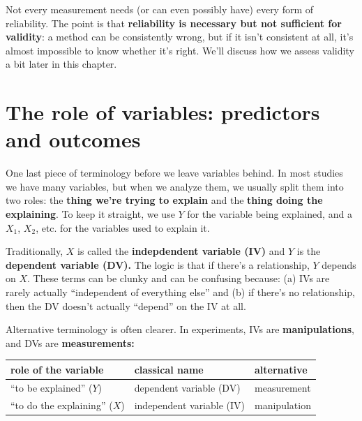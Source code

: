\documentclass[
  letterpaper,
  DIV=11,
  numbers=noendperiod]{scrreprt}
\begin{document}
Not every measurement needs (or can even possibly have) every form of
reliability. The point is that \textbf{reliability is necessary but not
sufficient for validity}: a method can be consistently wrong, but if it
isn't consistent at all, it's almost impossible to know whether it's
right. We'll discuss how we assess validity a bit later in this chapter.

\section{The role of variables: predictors and
outcomes}\label{the-role-of-variables-predictors-and-outcomes}

One last piece of terminology before we leave variables behind. In most
studies we have many variables, but when we analyze them, we usually
split them into two roles: the \textbf{thing we're trying to explain}
and the \textbf{thing doing the explaining}. To keep it straight, we use
\(Y\) for the variable being explained, and a \(X_1\), \(X_2\), etc. for
the variables used to explain it.

Traditionally, \(X\) is called the \textbf{indepdendent variable (IV)}
and \(Y\) is the \textbf{dependent variable (DV).} The logic is that if
there's a relationship, \(Y\) depends on \(X\). These terms can be
clunky and can be confusing because: (a) IVs are rarely actually
``independent of everything else'' and (b) if there's no relationship,
then the DV doesn't actually ``depend'' on the IV at all.

Alternative terminology is often clearer. In experiments, IVs are
\textbf{manipulations}, and DVs are \textbf{measurements:}

\begin{longtable}[]{@{}
  >{\raggedright\arraybackslash}p{}
  >{\raggedright\arraybackslash}p{}
  >{\raggedright\arraybackslash}p{}@{}}
\toprule\noalign{}
\begin{minipage}[b]{\linewidth}\raggedright
role of the variable
\end{minipage} & \begin{minipage}[b]{\linewidth}\raggedright
classical name
\end{minipage} & \begin{minipage}[b]{\linewidth}\raggedright
alternative
\end{minipage} \\
\midrule\noalign{}
\endhead
\bottomrule\noalign{}
\endlastfoot
``to be explained'' (\(Y\)) & dependent variable (DV) & measurement \\
``to do the explaining'' (\(X\)) & independent variable (IV) &
manipulation \\
\end{longtable}
\end{document}
